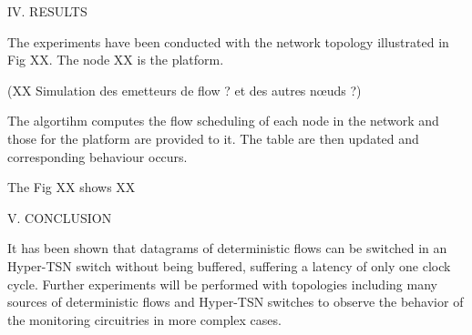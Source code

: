 IV. RESULTS

The experiments have been conducted with the network topology illustrated in Fig XX. The node XX is the platform.

(XX Simulation des emetteurs de flow ? et des autres nœuds ?)

The algortihm computes the flow scheduling of each node in the network and those for the platform are provided to it. The table are then updated and corresponding behaviour occurs.

The Fig XX shows XX

V. CONCLUSION

It has been shown that datagrams of deterministic flows can be switched in an Hyper-TSN switch without being buffered, suffering a latency of only one clock cycle. Further experiments will be performed with topologies including many sources of deterministic flows and Hyper-TSN switches to observe the behavior of the monitoring circuitries in more complex cases. 